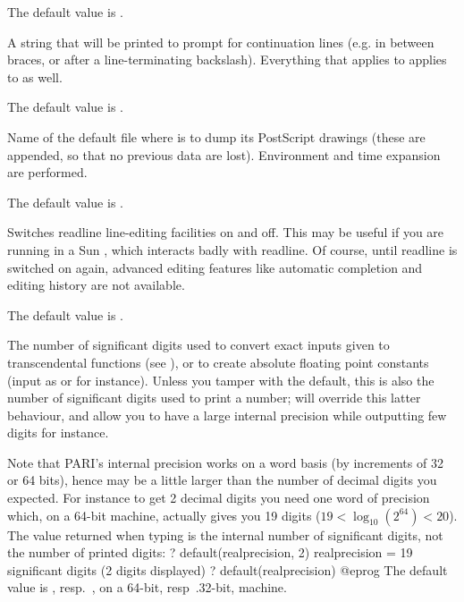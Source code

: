 {The default value is .

\label{se:def,prompt_cont}
A string that will be printed
to prompt for continuation lines (e.g. in between braces, or after a
line-terminating backslash). Everything that applies to 
applies to  as well.

The default value is .

\label{se:def,psfile}
Name of the default file where
 is to dump its PostScript drawings (these are appended, so that no
previous data are lost). Environment and time expansion are performed.

The default value is .

\label{se:def,readline}
Switches readline line-editing
facilities on and off. This may be useful if you are running  in a Sun
, which interacts badly with readline. Of course, until readline
is switched on again, advanced editing features like automatic completion
and editing history are not available.

The default value is .

\label{se:def,realprecision}
The number of significant digits used to convert exact inputs given to
transcendental functions (see ), or to create
absolute floating point constants (input as  or  for
instance). Unless you tamper with the  default, this is also
the number of significant digits used to print a  number;
 will override this latter behaviour, and allow you to have a
large internal precision while outputting few digits for instance.

Note that PARI's internal precision works on a word basis (by increments of
32 or 64 bits), hence may be a little larger than the number of decimal
digits you expected. For instance to get 2 decimal digits you need one word
of precision which, on a 64-bit machine, actually gives you 19 digits ($19 <
\log_{10}(2^{64}) < 20$). The value returned when typing
 is the internal number of significant digits,
not the number of printed digits:
\bprog
? default(realprecision, 2)
      realprecision = 19 significant digits (2 digits displayed)
? default(realprecision)
@eprog
The default value is , resp.~, on a 64-bit, resp~.32-bit,
machine.

}
